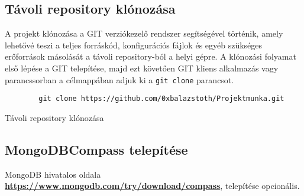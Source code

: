 \subsection{Távoli repository klónozása}
\begin{flushleft}
    A projekt klónozása a GIT verziókezelő rendszer segítségével történik, amely lehetővé teszi a teljes forráskód, konfigurációs fájlok és egyéb szükséges erőforrások másolását a távoli repository-ból a helyi gépre. A klónozási folyamat első lépése a GIT telepítése, majd ezt követően GIT kliens alkalmazás vagy parancssorban a célmappában adjuk ki a \verb|git clone| parancsot.
\end{flushleft}
\begin{listing}[H]
    \begin{verbatim}
        git clone https://github.com/0xbalazstoth/Projektmunka.git
    \end{verbatim}
    \caption{Távoli repository klónozása}
    \label{code:repo_clone}
\end{listing}

\subsection{MongoDBCompass telepítése}
\begin{flushleft}
    MongoDB hivatalos oldala \textbf{\href{https://www.mongodb.com/try/download/compass}{https://www.mongodb.com/try/download/compass}}, telepítése opcionális.
\end{flushleft}